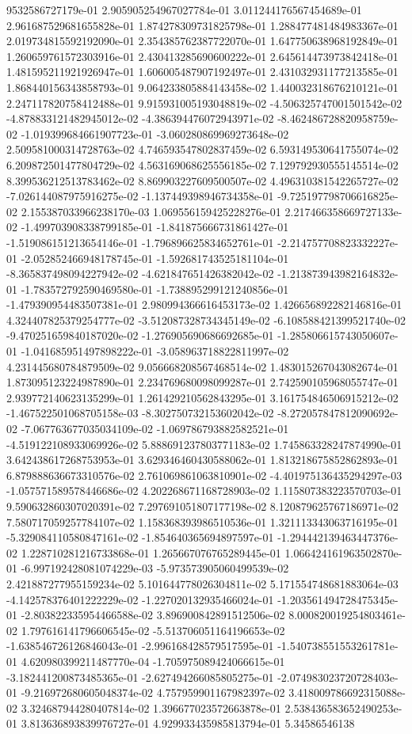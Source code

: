9532586727179e-01	2.905905254967027784e-01	3.011244176567454689e-01	2.961687529681655828e-01	1.874278309731825798e-01	1.288477481484983367e-01	2.019734815592192090e-01	2.354385762387722070e-01	1.647750638968192849e-01	1.260659761572303916e-01	2.430413285690600222e-01	2.645614473973842418e-01	1.481595211921926947e-01	1.606005487907192497e-01	2.431032931177213585e-01	1.868440156343858793e-01	9.064233805884143458e-02	1.440032318676210121e-01	2.247117820758412488e-01	9.915931005193048819e-02	-4.506325747001501542e-02	-4.878833121482945012e-02	-4.386394476072943971e-02	-8.462486728820958759e-02	-1.019399684661907723e-01	-3.060280869969273648e-02	2.509581000314728763e-02	4.746593547802837459e-02	6.593149530641755074e-02	6.209872501477804729e-02	4.563169068625556185e-02	7.129792930555145514e-02	8.399536212513783462e-02	8.869903227609500507e-02	4.496310381542265727e-02	-7.026144087975916275e-02	-1.137449398946734358e-01	-9.725197798706616825e-02	2.155387033966238170e-03	1.069556159425228276e-01	2.217466358669727133e-02	-1.499703908338799185e-01	-1.841875666731861427e-01	-1.519086151213654146e-01	-1.796896625834652761e-01	-2.214757708823332227e-01	-2.052852466948178745e-01	-1.592681743525181104e-01	-8.365837498094227942e-02	-4.621847651426382042e-02	-1.213873943982164832e-01	-1.783572792590469580e-01	-1.738895299121240856e-01	-1.479390954483507381e-01	2.980994366616453173e-02	1.426656892282146816e-01	4.324407825379254777e-02	-3.512087328734345149e-02	-6.108588421399521740e-02	-9.470251659840187020e-02	-1.276905690686692685e-01	-1.285806615743050607e-01	-1.041685951497898222e-01	-3.058963718822811997e-02	4.231445680784879509e-02	9.056668208567468514e-02	1.483015267043082674e-01	1.873095123224987890e-01	2.234769680098099287e-01	2.742590105968055747e-01	2.939772140623135299e-01	1.261429210562843295e-01	3.161754846506915212e-02	-1.467522501068705158e-03	-8.302750732153602042e-02	-8.272057847812090692e-02	-7.067763677035034109e-02	-1.069786793882582521e-01	-4.519122108933069926e-02	5.888691237803771183e-02	1.745863328247874990e-01	3.642438617268753953e-01	3.629346460430588062e-01	1.813218675852862893e-01	6.879888636673310576e-02	2.761069861063810901e-02	-4.401975136435294297e-03	-1.057571589578446686e-02	4.202268671168728903e-02	1.115807383223570703e-01	9.590632860307020391e-02	7.297691051807177198e-02	8.120879625767186971e-02	7.580717059257784107e-02	1.158368393986510536e-01	1.321113343063716195e-01	-5.329084110580847161e-02	-1.854640365694897597e-01	-1.294442139463447376e-02	1.228710281216733868e-01	1.265667076765289445e-01	1.066424161963502870e-01	-6.997192428081074229e-03	-5.973573905060499539e-02	2.421887277955159234e-02	5.101644778026304811e-02	5.171554748681883064e-03	-4.142578376401222229e-02	-1.227020132935466024e-01	-1.203561494728475345e-01	-2.803822335954466588e-02	3.896900842891512506e-02	8.000820019254803461e-02	1.797616141796606545e-02	-5.513706051164196653e-02	-1.638546726126846043e-01	-2.996168428579517595e-01	-1.540738551553261781e-01	4.620980399211487770e-04	-1.705975089424066615e-01	-3.182441200873485365e-01	-2.627494266085805275e-01	-2.074983023720728403e-01	-9.216972680605048374e-02	4.757959901167982397e-02	3.418009786692315088e-02	3.324687944280407814e-02	1.396677023572663878e-01	2.538436583652490253e-01	3.813636893839976727e-01	4.929933435985813794e-01	5.34586546138